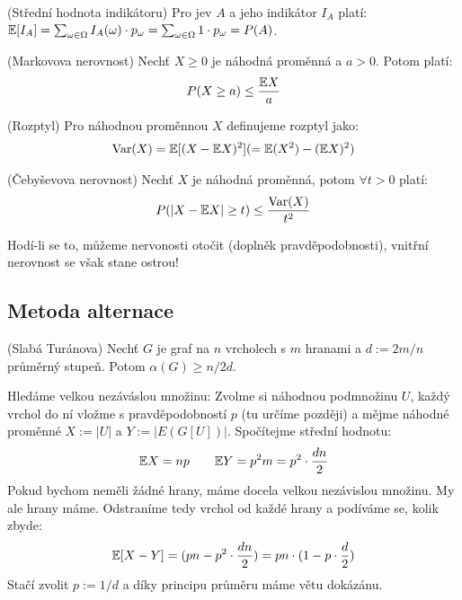 \poz (Střední hodnota indikátoru) Pro jev $A$ a jeho indikátor $I_A$ platí:
$\mathbb{E}[I_A] = \sum_{\omega \in \Omega} I_A(\omega) \cdot p_\omega = \sum_{\omega
\in \Omega} 1 \cdot p_\omega = P(A)$.

\vt (Markovova nerovnost) Nechť $X \geq 0$ je náhodná proměnná a $a > 0$. Potom
platí:
\begin{align}
	P(X \geq a) \leq {\mathbb{E}X \over a}
\end{align}

\df (Rozptyl) Pro náhodnou proměnnou $X$ definujeme rozptyl jako:
\begin{align}
	\operatorname{Var}(X) = \mathbb{E}[(X - \mathbb{E} X)^2] ( = \mathbb{E}(X^2) - (\mathbb{E} X)^2 )
\end{align}

\vt (Čebyševova nerovnost) Nechť $X$ je náhodná proměnná, potom $\forall t > 0$
platí:
\begin{align}
	P(|X - \mathbb{E} X| \geq t) \leq {\operatorname{Var}(X) \over t^2}
\end{align}

\pzn Hodí-li se to, můžeme nervonosti otočit (doplněk pravděpodobnosti), vnitřní
nerovnost se však stane ostrou!



\subsection{Metoda alternace}

\vt (Slabá Turánova) Nechť $G$ je graf na $n$ vrcholech s $m$ hranami a $d :=
2m/n$ průměrný stupeň. Potom $\alpha(G) \geq n/2d$.

\dk Hledáme velkou nezáváslou množinu: Zvolme si náhodnou podmnožinu $U$, každý
vrchol do ní vložme s pravděpodobností $p$ (tu určíme později) a mějme náhodné
proměnné $X := |U|$ a $Y := |E(G[U])|$. Spočítejme střední hodnotu:
\begin{align}
	\mathbb{E} X = np \qquad \mathbb{E} Y = p^2 m = p^2 \cdot {dn \over 2 }
\end{align}
Pokud bychom neměli žádné hrany, máme docela velkou nezávislou množinu. My ale
hrany máme. Odstraníme tedy vrchol od každé hrany a podíváme se, kolik zbyde:
\begin{align}
	\mathbb{E}[X - Y] = (pn - p^2 \cdot {dn \over 2}) = pn \cdot (1-p \cdot {d \over 2})
\end{align}
Stačí zvolit $ p := 1/d$ a díky principu průměru máme větu dokázánu.

